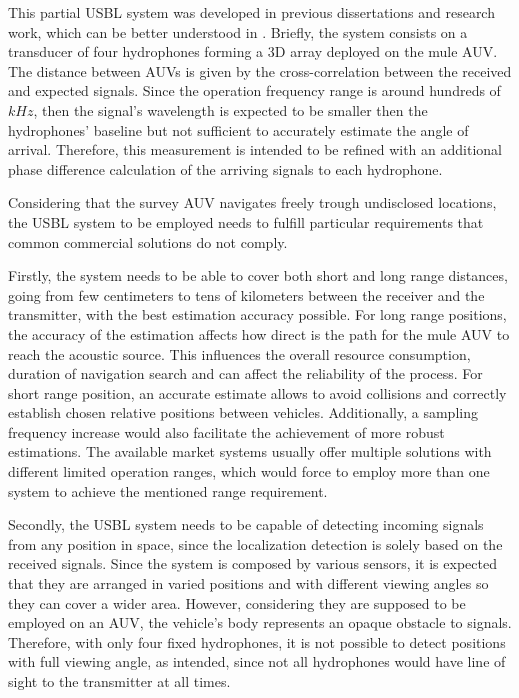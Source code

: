 This partial USBL system was developed in previous dissertations and research work, which can be better understood in \cite{afonso-thesis}. Briefly, the system consists on a transducer of four hydrophones forming a 3D array deployed on the mule AUV. The distance between AUVs is given by the cross-correlation between the received and expected signals. Since the operation frequency range is around hundreds of $kHz$, then the signal's wavelength is expected to be smaller then the hydrophones' baseline but not sufficient to accurately estimate the angle of arrival. Therefore, this measurement is intended to be refined with an additional phase difference calculation of the arriving signals to each hydrophone.

Considering that the survey AUV navigates freely trough undisclosed locations, the USBL system to be employed needs to fulfill particular requirements that common commercial solutions do not comply. 

Firstly, the system needs to be able to cover both short and long range distances, going from few centimeters to tens of kilometers between the receiver and the transmitter, with the best estimation accuracy possible. For long range positions, the accuracy of the estimation affects how direct is the path for the mule AUV to reach the acoustic source. This influences the overall resource consumption, duration of navigation search and can affect the reliability of the process. For short range position, an accurate estimate allows to avoid collisions and correctly establish chosen relative positions between vehicles. Additionally, a sampling frequency increase would also facilitate the achievement of more robust estimations. The available market systems usually offer multiple solutions with different limited operation ranges, which would force to employ more than one system to achieve the mentioned range requirement.

Secondly, the USBL system needs to be capable of detecting incoming signals from any position in space, since the localization detection is solely based on the received signals. Since the system is composed by various sensors, it is expected that they are arranged in varied positions and with different viewing angles so they can cover a wider area. However, considering they are supposed to be employed on an AUV, the vehicle's body represents an opaque obstacle to signals. Therefore, with only four fixed hydrophones, it is not possible to detect positions with full viewing angle, as intended, since not all hydrophones would have line of sight to the transmitter at all times.

